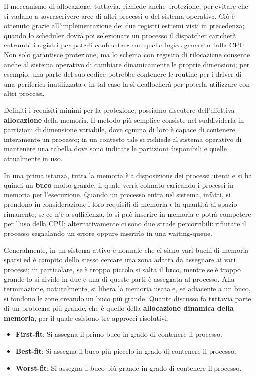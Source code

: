 \noindent Il meccanismo di allocazione, tuttavia, richiede anche protezione, per evitare che si vadano a sovrascrivere aree di altri processi o del
sistema operativo. Ciò è ottenuto grazie all'implementazione dei due registri estremi visti in precedenza; quando lo scheduler dovrà poi selezionare un
processo il dispatcher caricherà entrambi i registri per poterli confrontare con quello logico generato dalla CPU. Non solo garantisce protezione, ma lo
schema con registro di rilocazione consente anche al sistema operativo di cambiare dinamicamente le proprie dimensioni; per esempio, una parte del suo
codice potrebbe contenere le routine per i driver di una periferica inutilizzata e in tal caso la si deallocherà per poterla utilizzare con altri
processi.\par
Definiti i requisiti minimi per la protezione, possiamo discutere dell'effettiva \textbf{allocazione} della memoria. Il metodo più semplice consiste nel
suddividerla in partizioni di dimensione variabile, dove ognuna di loro è capace di contenere interamente un processo; in un contesto tale si richiede
al sistema operativo di mantenere una tabella dove sono indicate le partizioni disponibili e quelle attualmente in uso.\par
In una prima istanza, tutta la memoria è a disposizione dei processi utenti e si ha quindi un \textbf{buco} molto grande, il quale verrà colmato
caricando i processi in memoria per l'esecuzione. Quando un processo entra nel sistema, infatti, si prendono in considerazione i loro requisiti di
memoria e la quantità di spazio rimanente; se ce n'è a sufficienza, lo si può inserire in memoria e potrà competere per l'uso della CPU;
alternativamente ci sono due strade percorribili: rifiutare il processo segnalando un errore oppure inserirlo in una waiting-queue.\par
Generalmente, in un sistema attivo è normale che ci siano vari buchi di memoria sparsi ed è compito dello stesso cercare una zona adatta da assegnare
ai vari processi; in particolare, se è troppo piccolo si salta il buco, mentre se è troppo grande lo si divide in due e una di queste parti è assegnata
al processo. Alla terminazione, naturalmente, si libera la memoria usata e, se adiacente a un buco, si fondono le zone creando un buco più grande.
Quanto discusso fa tuttavia parte di un problema più grande, che è quello della \textbf{allocazione dinamica della memoria}, per il quale esistono tre
approcci risolutivi: \begin{itemize}
    \item \textbf{First-fit}: Si assegna il primo buco in grado di contenere il processo.
    \item \textbf{Best-fit}: Si assegna il buco più piccolo in grado di contenere il processo.
    \item \textbf{Worst-fit}: Si assegna il buco più grande in grado di contenere il processo.
\end{itemize}

